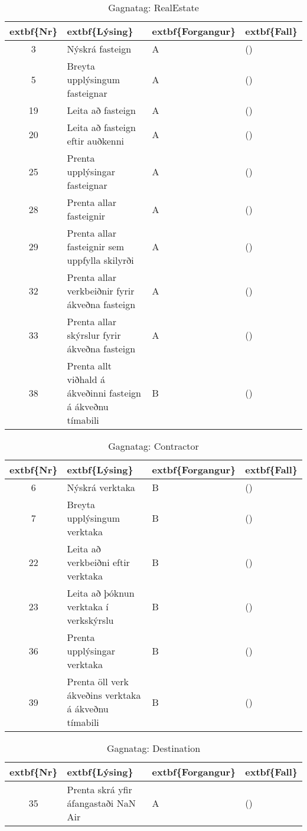 \begin{table}[h!]\centering
\begin{tabular}{|c|p{10cm}|l|l|}
\hline
	extbf\{Nr\}&	extbf\{Lýsing\}&	extbf\{Forgangur\}&	extbf\{Fall\}\\
\hline
3&Nýskrá fasteign&A &()\\
\hline
5&Breyta upplýsingum fasteignar&A &()\\
\hline
19&Leita að fasteign&A &()\\
\hline
20&Leita að fasteign eftir auðkenni&A &()\\
\hline
25&Prenta upplýsingar fasteignar&A &()\\
\hline
28&Prenta allar fasteignir&A &()\\
\hline
29&Prenta allar fasteignir sem uppfylla skilyrði&A &()\\
\hline
32&Prenta allar verkbeiðnir fyrir ákveðna fasteign&A &()\\
\hline
33&Prenta allar skýrslur fyrir ákveðna fasteign&A &()\\
\hline
38&Prenta allt viðhald á ákveðinni fasteign á ákveðnu tímabili&B &()\\
\hline
\end{tabular}
\caption{Gagnatag: RealEstate}
\label{tab:RealEstate}\end{table}
\begin{table}[h!]\centering
\begin{tabular}{|c|p{10cm}|l|l|}
\hline
	extbf\{Nr\}&	extbf\{Lýsing\}&	extbf\{Forgangur\}&	extbf\{Fall\}\\
\hline
6&Nýskrá verktaka&B &()\\
\hline
7&Breyta upplýsingum verktaka&B &()\\
\hline
22&Leita að verkbeiðni eftir verktaka&B &()\\
\hline
23&Leita að þóknun verktaka í verkskýrslu&B &()\\
\hline
36&Prenta upplýsingar verktaka&B &()\\
\hline
39&Prenta öll verk ákveðins verktaka á ákveðnu tímabili&B &()\\
\hline
\end{tabular}
\caption{Gagnatag: Contractor}
\label{tab:Contractor}\end{table}
\begin{table}[h!]\centering
\begin{tabular}{|c|p{10cm}|l|l|}
\hline
	extbf\{Nr\}&	extbf\{Lýsing\}&	extbf\{Forgangur\}&	extbf\{Fall\}\\
\hline
35&Prenta skrá yfir áfangastaði NaN Air&A &()\\
\hline
\end{tabular}
\caption{Gagnatag: Destination}
\label{tab:Destination}\end{table}
